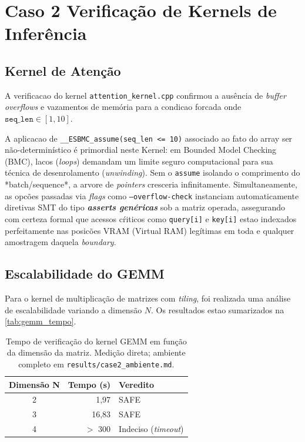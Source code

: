 \section{Caso 2   Verificação de Kernels de Inferência}

\subsection{Kernel de Atenção}

A verificacao do kernel \texttt{attention\_kernel.cpp} confirmou a aus\^encia de \textit{buffer overflows} e vazamentos de mem\'oria para a condicao forcada onde $\texttt{seq\_len} \in [1, 10]$.

A aplicacao de \texttt{\_\_ESBMC\_assume(seq\_len <= 10)} associado ao fato do array ser não-determinístico é primordial neste Kernel: em Bounded Model Checking (BMC), lacos (\textit{loops}) demandam um limite seguro computacional para sua t\'ecnica de desenrolamento (\textit{unwinding}). Sem o \texttt{assume} isolando o comprimento do *batch/sequence*, a arvore de \textit{pointers} cresceria infinitamente. Simultaneamente, as opc\~oes passadas via \textit{flags} como \texttt{--overflow-check} instanciam automaticamente diretivas SMT do tipo \textbf{\textit{asserts gen\'ericas}} sob a matriz operada, assegurando com certeza formal que acessos c\'riticos como \texttt{query[i]} e \texttt{key[i]} estao indexados perfeitamente nas posic\~oes VRAM (Virtual RAM) leg\'itimas em toda e qualquer amostragem daquela \textit{boundary}.

\subsection{Escalabilidade do GEMM}

Para o kernel de multiplicação de matrizes com \textit{tiling}, foi realizada uma análise de escalabilidade variando a dimensão $N$. Os resultados estao sumarizados na \autoref{tab:gemm_tempo}.

\begin{table}[htb]
\caption{Tempo de verificação do kernel GEMM em função da dimensão da matriz. Medição direta; ambiente completo em \texttt{results/case2\_ambiente.md}.}
\label{tab:gemm_tempo}
\begin{center}
\begin{tabular}{c|r|l}
\hline
\textbf{Dimensão N} & \textbf{Tempo (s)} & \textbf{Veredito} \\
\hline
2 & 1,97   & SAFE \\
3 & 16,83  & SAFE \\
4 & $>$ 300 & Indeciso (\textit{timeout}) \\
\hline
\end{tabular}
\end{center}
\end{table}

